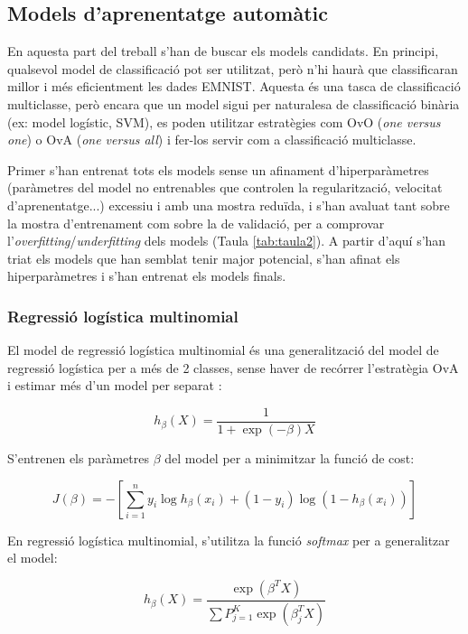 \documentclass[12pt, spanish]{article}
\begin{document}
\subsection{Models d'aprenentatge automàtic}


En aquesta part del treball s'han de buscar els models candidats. En principi, qualsevol model de classificació pot ser utilitzat, però n'hi haurà que classificaran millor i més eficientment les dades EMNIST. Aquesta és una tasca de classificació multiclasse, però encara que un model sigui per naturalesa de classificació binària (ex: model logístic, SVM), es poden utilitzar estratègies com OvO (\textit{one versus one}) o OvA (\textit{one versus all}) i fer-los servir com a classificació multiclasse. 

Primer s'han entrenat tots els models sense un afinament d'hiperparàmetres (paràmetres del model no entrenables que controlen la regularització, velocitat d'aprenentatge...) excessiu i amb una mostra reduïda, i s'han avaluat tant sobre la mostra d'entrenament com sobre la de validació, per a comprovar l'\textit{overfitting}/\textit{underfitting} dels models (Taula \ref{tab:taula2}). A partir d'aquí s'han triat els models que han semblat tenir major potencial, s'han afinat els hiperparàmetres i s'han entrenat els models finals. 

\subsubsection{Regressió logística multinomial}

El model de regressió logística multinomial és una generalització del model de regressió logística per a més de 2 classes, sense haver de recórrer l'estratègia OvA i estimar més d'un model per separat \cite{stanford}:

$$
h_\beta(X) = \frac{1}{1 + \exp(-\beta)X}
$$

S'entrenen els paràmetres $\beta$ del model per a minimitzar la funció de cost:

$$
J(\beta) = -[\sum^n_{i = 1} y_i \log h_\beta (x_i) + (1 - y_i) \log (1 - h_\beta(x_i))]
$$

En regressió logística multinomial, s'utilitza la funció \textit{softmax} per a generalitzar el model:

$$
h_\beta(X) = \frac{\exp(\beta^T X)}{\sum P^K_{j=1} \exp(\beta_j^T X)}
$$
\end{document}
